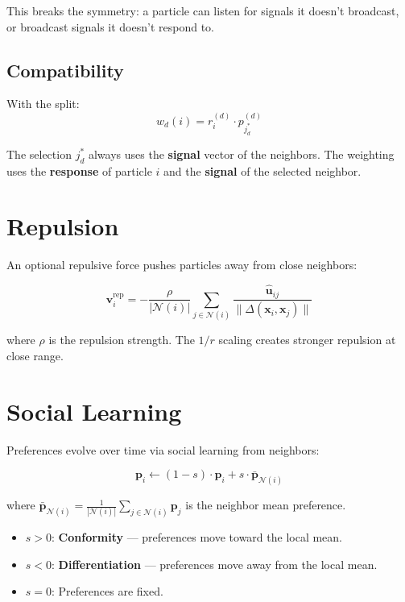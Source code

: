 \documentclass[11pt,a4paper]{article}
\begin{document}
This breaks the symmetry: a particle can listen for signals it doesn't broadcast, or broadcast signals it doesn't respond to.

\subsection{Compatibility}

With the split:
\begin{equation}
w_d(i) = r_i^{(d)} \cdot p_{j^*_d}^{(d)}
\end{equation}

The selection $j^*_d$ always uses the \textbf{signal} vector of the neighbors. The weighting uses the \textbf{response} of particle $i$ and the \textbf{signal} of the selected neighbor.

\section{Repulsion}

An optional repulsive force pushes particles away from close neighbors:

\begin{equation}
\mathbf{v}_i^{\mathrm{rep}} = -\frac{\rho}{|\mathcal{N}(i)|} \sum_{j \in \mathcal{N}(i)} \frac{\hat{\mathbf{u}}_{ij}}{\|\Delta(\mathbf{x}_i, \mathbf{x}_j)\|}
\end{equation}

where $\rho$ is the repulsion strength. The $1/r$ scaling creates stronger repulsion at close range.

\section{Social Learning}

Preferences evolve over time via social learning from neighbors:

\begin{equation}
\mathbf{p}_i \leftarrow (1 - s) \cdot \mathbf{p}_i + s \cdot \bar{\mathbf{p}}_{\mathcal{N}(i)}
\end{equation}

where $\bar{\mathbf{p}}_{\mathcal{N}(i)} = \frac{1}{|\mathcal{N}(i)|} \sum_{j \in \mathcal{N}(i)} \mathbf{p}_j$ is the neighbor mean preference.

\begin{itemize}[nosep]
\item $s > 0$: \textbf{Conformity} --- preferences move toward the local mean.
\item $s < 0$: \textbf{Differentiation} --- preferences move away from the local mean.
\item $s = 0$: Preferences are fixed.
\end{itemize}
\end{document}
